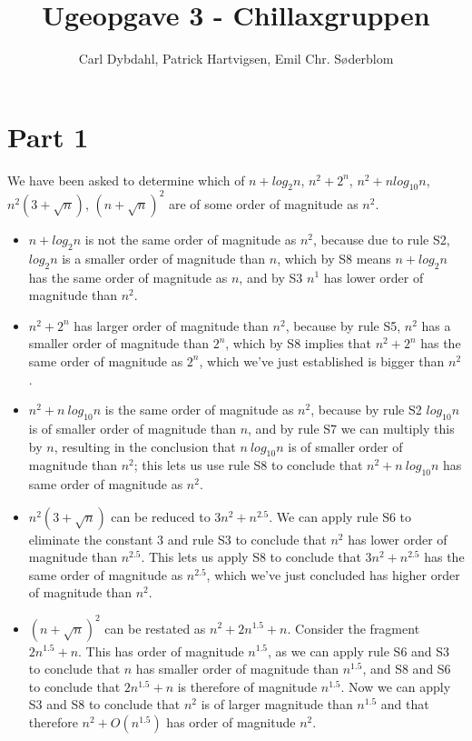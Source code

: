 \documentclass[a4paper]{article}
\title{Ugeopgave 3 - Chillaxgruppen}
\author{Carl Dybdahl, Patrick Hartvigsen, Emil Chr. Søderblom}
\begin{document}
\maketitle

\section{Part 1}

We have been asked to determine which of $n + log_2 n$, $n^2 + 2^n$, $n^2 + n log_10 n$, $n^2 (3 + \sqrt{n})$, $(n + \sqrt{n})^2$ are of some order of magnitude as $n^2$.

\begin{itemize}
\item $n + log_2 n$ is not the same order of magnitude as $n^2$, because due to rule S2, $log_2 n$ is a smaller order of magnitude than $n$, which by S8 means $n + log_2 n$ has the same order of magnitude as $n$, and by S3 $n^1$ has lower order of magnitude than $n^2$.
\item $n^2 + 2^n$ has larger order of magnitude than $n^2$, because by rule S5, $n^2$ has a smaller order of magnitude than $2^n$, which by S8 implies that $n^2 + 2^n$ has the same order of magnitude as $2^n$, which we've just established is bigger than $n^2$.
\item $n^2 + n ~ log_{10} n$ is the same order of magnitude as $n^2$, because by rule S2 $log_{10} n$ is of smaller order of magnitude than $n$, and by rule S7 we can multiply this by $n$, resulting in the conclusion that $n ~ log_{10} n$ is of smaller order of magnitude than $n^2$; this lets us use rule S8 to conclude that $n^2 + n ~ log_{10} n$ has same order of magnitude as $n^2$.
\item $n^2 (3 + \sqrt{n})$ can be reduced to $3 n^2 + n^{2.5}$. We can apply rule S6 to eliminate the constant $3$ and rule S3 to conclude that $n^2$ has lower order of magnitude than $n^{2.5}$. This lets us apply S8 to conclude that $3 n^2 + n^{2.5}$ has the same order of magnitude as $n^{2.5}$, which we've just concluded has higher order of magnitude than $n^2$.
\item $(n + \sqrt{n})^2$ can be restated as $n^2 + 2 n^{1.5} + n$. Consider the fragment $2 n^{1.5} + n$. This has order of magnitude $n^{1.5}$, as we can apply rule S6 and S3 to conclude that $n$ has smaller order of magnitude than $n^{1.5}$, and S8 and S6 to conclude that $2 n^{1.5} + n$ is therefore of magnitude $n^{1.5}$. Now we can apply S3 and S8 to conclude that $n^2$ is of larger magnitude than $n^{1.5}$ and that therefore $n^2 + O(n^{1.5})$ has order of magnitude $n^2$.
\end{itemize}
\end{document}
